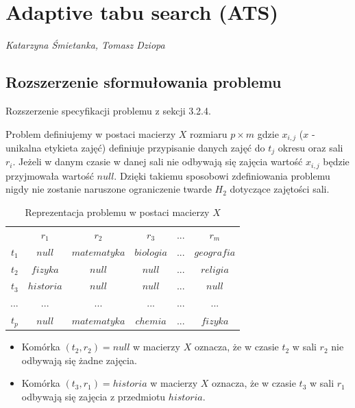 
\section{Adaptive tabu search (ATS)}
\textit{Katarzyna Śmietanka, Tomasz Dziopa}
\subsection{Rozszerzenie sformułowania problemu }
Rozszerzenie specyfikacji problemu z sekcji 3.2.4.
\par Problem definiujemy w postaci macierzy ${X}$  rozmiaru ${p \times m}$ gdzie ${x_{i,j}}$ ($x$ - unikalna etykieta zajęć) definiuje przypisanie danych zajęć do ${t_{j}}$ okresu oraz sali ${r_{i}}$. Jeżeli w danym czasie w danej sali nie odbywają się zajęcia wartość ${x_{i,j}}$ będzie przyjmowała wartość ${null}$. Dzięki takiemu sposobowi zdefiniowania problemu nigdy nie zostanie naruszone ograniczenie twarde ${H_{2}}$ dotyczące zajętości sali.

\begin{table}[H]
\begin{center}

\begin{tabular}{ r|c|c|c|c|c| }
\multicolumn{1}{r}{}
 &  \multicolumn{1}{c}{$r_{1}$}
 & \multicolumn{1}{c}{$r_{2}$} 
 & \multicolumn{1}{c}{$r_{3}$} 
 & \multicolumn{1}{c}{$...$} 
 & \multicolumn{1}{c}{$r_{m}$} 
 \\
\cline{2-6}
$t_{1}$ & $null$ & $matematyka$ & $biologia$ & $...$ & $geografia$ \\
\cline{2-6}
$t_{2}$ & $fizyka$ & $null$  & $null$ & $...$ & $religia$\\
\cline{2-6}
$t_{3}$ & $historia$ & $null$  & $null$ & $...$ & $null$\\
\cline{2-6}
$...$ & $...$ & $...$ & $...$ & $...$ & $...$ \\
\cline{2-6}
$t_{p}$ & $null$ & $matematyka$ & $chemia$ & $...$ & $fizyka$ \\
\cline{2-6}
\end{tabular}
\end{center}
\caption {Reprezentacja problemu w postaci macierzy $X$}
\end{table} 
\begin{itemize}
 \item Komórka $(t_{2}, r_{2}) = null$ w macierzy $X$ oznacza, że w czasie $t_{2}$ w sali $r_{2}$ nie odbywają się żadne zajęcia.
 \item Komórka $(t_{3}, r_{1}) = historia$ w macierzy $X$ oznacza, że w czasie $t_{3}$ w sali $r_{1}$ odbywają się zajęcia z przedmiotu $historia$.
\end{itemize}


